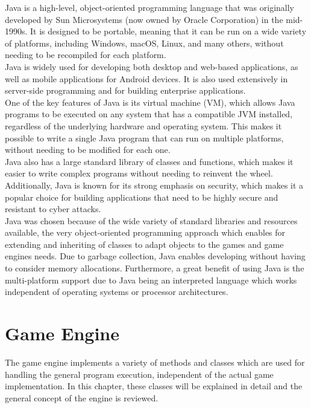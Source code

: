 Java is a high-level, object-oriented programming language that was originally developed by Sun Microsystems (now owned by Oracle Corporation) in the mid-1990s.
It is designed to be portable, meaning that it can be run on a wide variety of platforms, including Windows, macOS, Linux, and many others, without needing to be recompiled for each platform.
\\
Java is widely used for developing both desktop and web-based applications, as well as mobile applications for Android devices.
It is also used extensively in server-side programming and for building enterprise applications.
\\
One of the key features of Java is its virtual machine (VM), which allows Java programs to be executed on any system that has a compatible JVM installed, regardless of the underlying hardware and operating system.
This makes it possible to write a single Java program that can run on multiple platforms, without needing to be modified for each one.
\\
Java also has a large standard library of classes and functions, which makes it easier to write complex programs without needing to reinvent the wheel.
Additionally, Java is known for its strong emphasis on security, which makes it a popular choice for building applications that need to be highly secure and resistant to cyber attacks.
\\
Java was chosen because of the wide variety of standard libraries and resources available, the very object-oriented programming approach which enables for
extending and inheriting of classes to adapt objects to the games and game engines needs.
Due to garbage collection, Java enables developing without having to consider memory allocations.
Furthermore, a great benefit of using Java is the multi-platform support due to Java being an interpreted language which works
independent of operating systems or processor architectures.

\section{Game Engine}\label{sec:game}
The game engine implements a variety of methods and classes which are used for handling the general program execution, independent of the actual game implementation.
In this chapter, these classes will be explained in detail and the general concept of the engine is reviewed.

